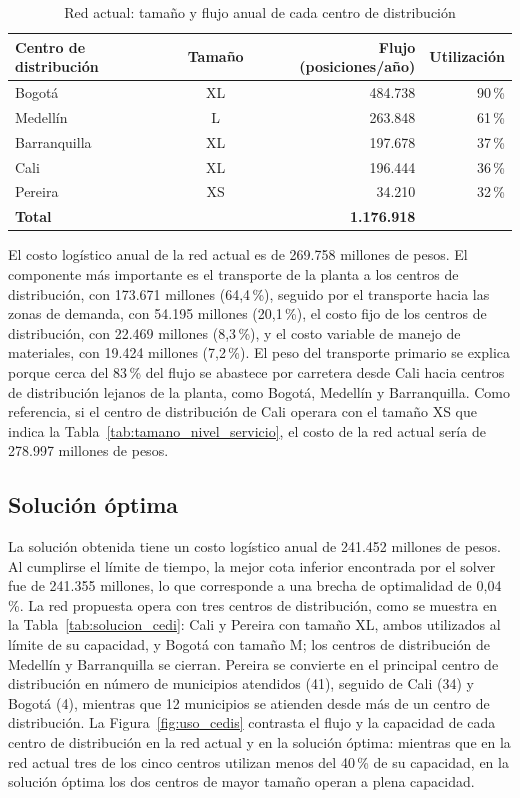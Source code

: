 \documentclass[fleqn, 11pt,letterpaper]{article}
\begin{document}
\begin{table}[H]
\centering
\caption{Red actual: tamaño y flujo anual de cada centro de distribución}
\label{tab:linea_base_cedi}
\begin{tabular}{lcrr}
\toprule
\textbf{Centro de distribución} & \textbf{Tamaño} & \textbf{Flujo (posiciones/año)} & \textbf{Utilización} \\
\midrule
Bogotá       & XL & 484.738 & 90\,\% \\
Medellín     & L  & 263.848 & 61\,\% \\
Barranquilla & XL & 197.678 & 37\,\% \\
Cali         & XL & 196.444 & 36\,\% \\
Pereira      & XS &  34.210 & 32\,\% \\
\midrule
\textbf{Total} & & \textbf{1.176.918} & \\
\bottomrule
\end{tabular}
\end{table}

El costo logístico anual de la red actual es de 269.758 millones de pesos. El componente más importante es el transporte de la planta a los centros de distribución, con 173.671 millones (64,4\,\%), seguido por el transporte hacia las zonas de demanda, con 54.195 millones (20,1\,\%), el costo fijo de los centros de distribución, con 22.469 millones (8,3\,\%), y el costo variable de manejo de materiales, con 19.424 millones (7,2\,\%). El peso del transporte primario se explica porque cerca del 83\,\% del flujo se abastece por carretera desde Cali hacia centros de distribución lejanos de la planta, como Bogotá, Medellín y Barranquilla. Como referencia, si el centro de distribución de Cali operara con el tamaño XS que indica la Tabla~\ref{tab:tamano_nivel_servicio}, el costo de la red actual sería de 278.997 millones de pesos.

\subsection{Solución óptima}
La solución obtenida tiene un costo logístico anual de 241.452 millones de pesos. Al cumplirse el límite de tiempo, la mejor cota inferior encontrada por el solver fue de 241.355 millones, lo que corresponde a una brecha de optimalidad de 0,04\,\%. La red propuesta opera con tres centros de distribución, como se muestra en la Tabla~\ref{tab:solucion_cedi}: Cali y Pereira con tamaño XL, ambos utilizados al límite de su capacidad, y Bogotá con tamaño M; los centros de distribución de Medellín y Barranquilla se cierran. Pereira se convierte en el principal centro de distribución en número de municipios atendidos (41), seguido de Cali (34) y Bogotá (4), mientras que 12 municipios se atienden desde más de un centro de distribución. La Figura~\ref{fig:uso_cedis} contrasta el flujo y la capacidad de cada centro de distribución en la red actual y en la solución óptima: mientras que en la red actual tres de los cinco centros utilizan menos del 40\,\% de su capacidad, en la solución óptima los dos centros de mayor tamaño operan a plena capacidad.
\end{document}
